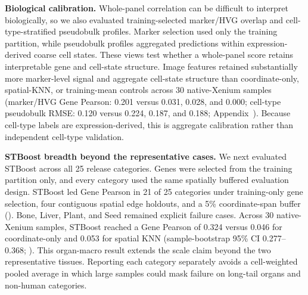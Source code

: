 \documentclass[sigconf,review]{acmart}
\newcommand{\methodname}{STBoost\xspace}
\begin{document}
\noindent\textbf{Biological calibration.}
Whole-panel correlation can be difficult to interpret biologically, so we also
evaluated training-selected marker/HVG overlap and cell-type-stratified
pseudobulk profiles. Marker selection used only the training partition, while
pseudobulk profiles aggregated predictions within expression-derived coarse
cell states. These views test whether a whole-panel score retains interpretable
gene and cell-state structure.
Image features retained substantially more marker-level signal and aggregate
cell-state structure than coordinate-only, spatial-KNN, or training-mean
controls across 30 native-Xenium samples (marker/HVG Gene Pearson: 0.201
versus 0.031, 0.028, and 0.000; cell-type pseudobulk RMSE: 0.120 versus
0.224, 0.187, and 0.188; Appendix~).
Because cell-type labels are expression-derived, this is aggregate calibration
rather than independent cell-type validation.

\noindent\textbf{STBoost breadth beyond the representative cases.}
We next evaluated \methodname across all 25 release categories. Genes were
selected from the training partition only, and every category used the same
spatially buffered evaluation design. \methodname led Gene Pearson in 21 of 25
categories under training-only gene selection, four contiguous spatial edge
holdouts, and a 5\% coordinate-span buffer (). Bone,
Liver, Plant, and Seed remained explicit failure cases. Across 30 native-Xenium
samples, \methodname reached a Gene Pearson of 0.324 versus 0.046 for
coordinate-only and 0.053 for spatial KNN
(sample-bootstrap 95\% CI 0.277--0.368; ). This
organ-macro result extends the scale claim beyond the two representative
tissues.
Reporting each category separately avoids a cell-weighted pooled average in
which large samples could mask failure on long-tail organs and non-human
categories.
\end{document}
